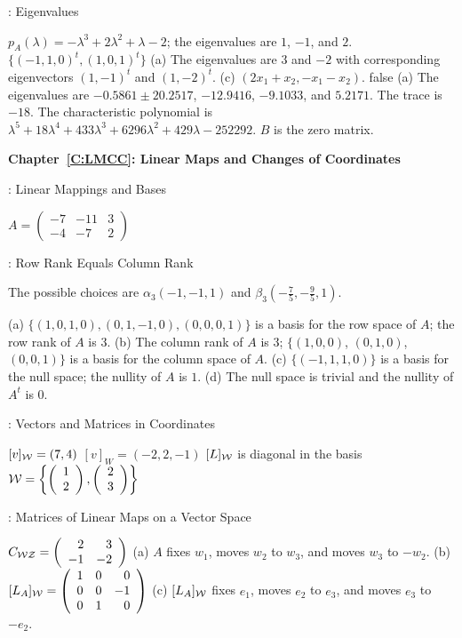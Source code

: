 : Eigenvalues

\ans $p_A(\lambda) = -\lambda^3 + 2\lambda^2 + \lambda - 2$; 
the eigenvalues are $1$, $-1$, and $2$.
\ans $\{(-1,1,0)^t, (1,0,1)^t\}$
(a) \ans The eigenvalues are $3$ and $-2$ with corresponding eigenvectors 
$(1,-1)^t$ and $(1,-2)^t$.
(c) \ans $(2x_1 + x_2, -x_1 - x_2)$. 
 false
(a) The eigenvalues are $-0.5861 \pm 20.2517$, $-12.9416$, $-9.1033$, 
and $5.2171$.  The trace is $-18$.  The characteristic polynomial is
$\lambda^5 + 18\lambda^4 + 433\lambda^3 + 6296\lambda^2 +
429\lambda - 252292$.
\ans $B$ is the zero matrix.



\vspace{0.08in}
{\bf Chapter~\ref{C:LMCC}: Linear Maps and Changes of Coordinates}


: Linear Mappings and Bases

$A = \left(\begin{array}{rrr} -7 & -11 & 3 \\ -4 & -7 & 2
\end{array}\right)$


: Row Rank Equals Column Rank

\ans The possible choices are $\alpha_3(-1,-1,1)$ and
$\beta_3(-\frac{7}{5},-\frac{9}{5},1)$.

(a) $\{(1,0,1,0), (0,1,-1,0), (0,0,0,1)\}$ is a basis for the row space of 
$A$; the row rank of $A$ is $3$.
(b) The column rank of $A$ is $3$; $\{(1,0,0)$, $(0,1,0)$, $(0,0,1)\}$ is 
a basis for the column space of $A$.
(c) $\{(-1,1,1,0)\}$ is a basis for the null space; the nullity of 
$A$ is $1$.  
(d) The null space is trivial and the nullity of $A^t$ is $0$.


: Vectors and Matrices in Coordinates

 \ans $[v]_{\cal W} = (7,4)$
 \ans $[v]_W = (-2,2,-1)$
 \ans $[L]_{\cal W}$ is diagonal in the basis
${\cal W} = \left\{\left(\begin{array}{r} 1 \\ 2\end{array}\right),\left(\begin{array}{r} 2 \\ 3\end{array}\right)\right\}$


: Matrices of Linear Maps on a Vector Space

 \ans $C_{\cal WZ} = \left(\begin{array}{rr} 2 & 3\\ -1 &-2\end{array}\right)$
  (a) \ans $A$ fixes $w_1$, moves $w_2$ to $w_3$, and moves 
$w_3$ to $-w_2$.
(b) \ans $[L_A]_{\cal W} = \left(\begin{array}{rrr} 1 & 0 & 0 \\ 0 & 0 & -1 \\ 0 & 1 & 0\end{array}\right)$
(c) \ans $[L_A]_{\cal W}$ fixes $e_1$, moves $e_2$ to
$e_3$, and moves $e_3$ to $-e_2$.



